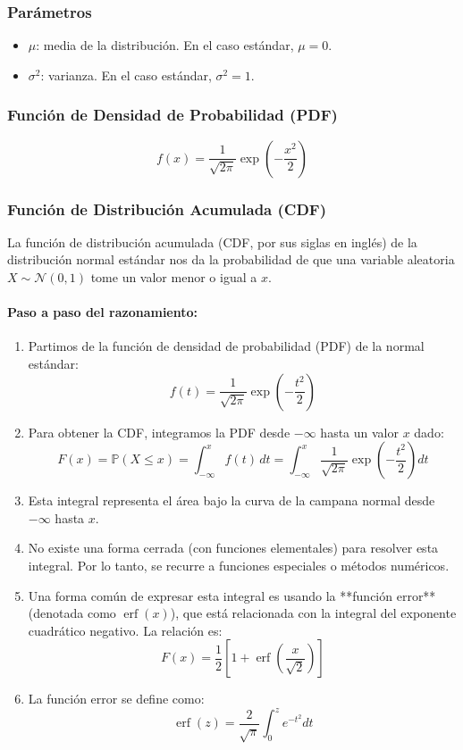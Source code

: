 \documentclass{article}
\begin{document}
\subsubsection*{Parámetros}
\begin{itemize}
  \item $\mu$: media de la distribución. En el caso estándar, $\mu = 0$.
  \item $\sigma^2$: varianza. En el caso estándar, $\sigma^2 = 1$.
\end{itemize}

\subsubsection*{Función de Densidad de Probabilidad (PDF)}
\[
f(x) = \frac{1}{\sqrt{2\pi}} \exp\left(-\frac{x^2}{2}\right)
\]

\subsubsection*{Función de Distribución Acumulada (CDF)}

La función de distribución acumulada (CDF, por sus siglas en inglés) de la distribución normal estándar nos da la probabilidad de que una variable aleatoria \( X \sim \mathcal{N}(0,1) \) tome un valor menor o igual a \( x \).

\paragraph{Paso a paso del razonamiento:}

\begin{enumerate}
  \item Partimos de la función de densidad de probabilidad (PDF) de la normal estándar:
  \[
  f(t) = \frac{1}{\sqrt{2\pi}} \exp\left(-\frac{t^2}{2}\right)
  \]
  
  \item Para obtener la CDF, integramos la PDF desde $-\infty$ hasta un valor $x$ dado:
  \[
  F(x) = \mathbb{P}(X \leq x) = \int_{-\infty}^{x} f(t)\, dt = \int_{-\infty}^{x} \frac{1}{\sqrt{2\pi}} \exp\left(-\frac{t^2}{2}\right) dt
  \]
  
  \item Esta integral representa el área bajo la curva de la campana normal desde $-\infty$ hasta $x$.
  
  \item No existe una forma cerrada (con funciones elementales) para resolver esta integral. Por lo tanto, se recurre a funciones especiales o métodos numéricos.
  
  \item Una forma común de expresar esta integral es usando la **función error** (denotada como $\operatorname{erf}(x)$), que está relacionada con la integral del exponente cuadrático negativo. La relación es:
  \[
  F(x) = \frac{1}{2} \left[1 + \operatorname{erf}\left(\frac{x}{\sqrt{2}}\right)\right]
  \]
  
  \item La función error se define como:
  \[
  \operatorname{erf}(z) = \frac{2}{\sqrt{\pi}} \int_0^z e^{-t^2} dt
  \]
  

\end{enumerate}
\end{document}

